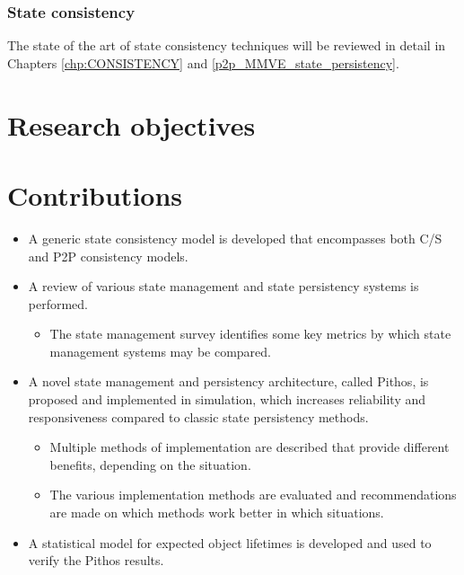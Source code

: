 \subsubsection{State consistency}

The state of the art of state consistency techniques will be reviewed in detail in Chapters \ref{chp:CONSISTENCY} and \ref{p2p_MMVE_state_persistency}.

\section{Research objectives}

\section{Contributions}
\label{objectives}

\begin{itemize}
\item A generic state consistency model is developed that encompasses both C/S and P2P consistency models.

\item A review of various state management and state persistency systems is performed.
    \begin{itemize}
    \item The state management survey identifies some key metrics by which state management systems may be compared.
    \end{itemize}

\item A novel state management and persistency architecture, called Pithos, is proposed and implemented in simulation, which increases reliability and responsiveness compared to classic state persistency methods.
    \begin{itemize}
    \item Multiple methods of implementation are described that provide different benefits, depending on the situation.
    \item The various implementation methods are evaluated and recommendations are made on which methods work better in which situations.
    \end{itemize}

\item A statistical model for expected object lifetimes is developed and used to verify the Pithos results.
\end{itemize}

